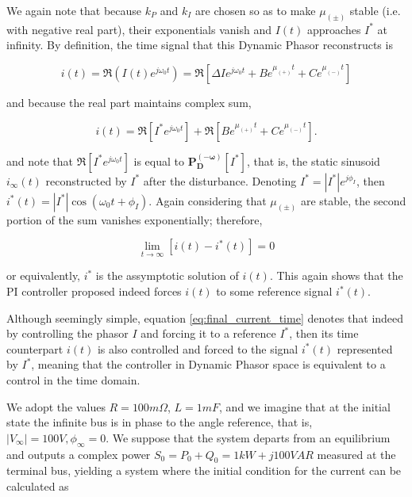 	We again note that because $k_P$ and $k_I$ are chosen so as to make $\mu_{(\pm)}$ stable (i.e. with negative real part), their exponentials vanish and $I(t)$ approaches $I^*$ at infinity. By definition, the time signal that this Dynamic Phasor reconstructs is

\begin{equation} i(t) = \Re\left(I(t)e^{j\omega_0 t}\right) = \Re\left[\Delta Ie^{j\omega_0 t} + Be^{\mu_{(+)}t} + Ce^{\mu_{(-)}t}\right] \end{equation}

	\noindent and because the real part maintains complex sum, 

\begin{equation} i(t) = \Re\left[ I^*e^{j\omega_0 t}\right] + \Re\left[Be^{\mu_{(+)}t} + Ce^{\mu_{(-)}t}\right]. \end{equation}

	\noindent and note that $\Re\left[ I^*e^{j\omega_0 t}\right]$ is equal to $\mathbf{P_D^{(-\omega)}}\left[I^*\right]$, that is, the static sinusoid $i_\infty(t)$ reconstructed by $I^*$ after the disturbance. Denoting $I^* = \left\lvert I^*\right\rvert e^{j\phi_I}$, then $i^*(t) = \left\lvert I^* \right\rvert \cos\left(\omega_0t + \phi_I\right)$. Again considering that $\mu_{(\pm)}$ are stable, the second portion of the sum vanishes exponentially; therefore,

\begin{equation} \lim\limits_{t\to\infty} \left[ i(t) - i^*(t)\right] = 0 \label{eq:final_current_time}\end{equation}

	\noindent or equivalently, $i^*$ is the assymptotic solution of $i(t)$. This again shows that the PI controller proposed indeed forces $i(t)$ to some reference signal $i^*(t)$.

	Although seemingly simple, equation \eqref{eq:final_current_time} denotes that indeed by controlling the phasor $I$ and forcing it to a reference $I^*$, then its time counterpart $i(t)$ is also controlled and forced to the signal $i^*(t)$ represented by $I^*$, meaning that the controller in Dynamic Phasor space is equivalent to a control in the time domain.

	We adopt the values $R = 100m\Omega$, $L = 1mF$, and we imagine that at the initial state the infinite bus is in phase to the angle reference, that is, $\left\lvert V_\infty\right\rvert = 100V, \phi_\infty = 0$. We suppose that the system departs from an equilibrium and outputs a complex power $S_0 = P_0 + Q_0 = 1kW + j100VAR$ measured at the terminal bus, yielding a system where the initial condition for the current can be calculated as

